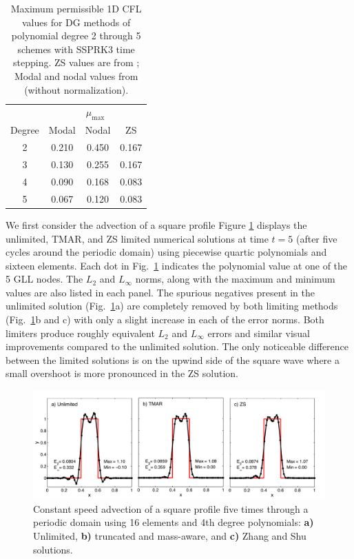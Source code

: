 \documentclass{ametsoc}
\begin{document}
\begin{table}[!hb]
\begin{tabular}{cccc}
\toprule
& \multicolumn{3}{c}{$\mu_{\text{max}}$} \\ \cline{2-4} 
Degree  & Modal & Nodal & ZS \\
\midrule
2 & 0.210 & 0.450 & 0.167 \\
3 & 0.130 & 0.255 & 0.167 \\
4 & 0.090 & 0.168 & 0.083 \\
5 & 0.067 & 0.120 & 0.083 \\
\bottomrule
\end{tabular}
\caption{Maximum permissible 1D CFL values for DG methods of polynomial degree 2 through 5 schemes with SSPRK3 time stepping. ZS values are from \cite{Zhang2010}; Modal and nodal values from \cite{ullrichWaves2013} (without normalization).}
\label{cflTable}
\end{table}

We first consider the advection of a square profile
Figure \ref{fig:sqwave} displays the unlimited, TMAR, and ZS limited numerical solutions at time $t=5$ (after five cycles around the periodic domain) using piecewise quartic polynomials and sixteen elements. Each dot in Fig.~\ref{fig:sqwave} indicates the polynomial value at one of the 5 GLL nodes. The $L_2$ and $L_{\infty}$ norms, along with the maximum and minimum values are also listed in each panel. The spurious negatives present in the unlimited solution (Fig.~\ref{fig:sqwave}a) are completely removed by both limiting methods (Fig.~\ref{fig:sqwave}b and c) with only a slight increase in each of the error norms. Both limiters produce roughly equivalent $L_2$ and $L_{\infty}$ errors and similar visual improvements compared to the unlimited solution. The only noticeable difference between the limited solutions is on the upwind side of the square wave where a small overshoot is more pronounced in the ZS solution.

\begin{figure}
\includegraphics[width=\textwidth]{figs/1d/sqwaveCmpre_N4E16_nodal.pdf}
\caption{Constant speed advection of a square profile five times through a periodic domain using 16 elements and 4th degree polynomials: {\bf a)} Unlimited, {\bf b)} truncated and mass-aware, and {\bf c)} Zhang and Shu solutions.} \label{fig:sqwave}
\end{figure}
\end{document}

